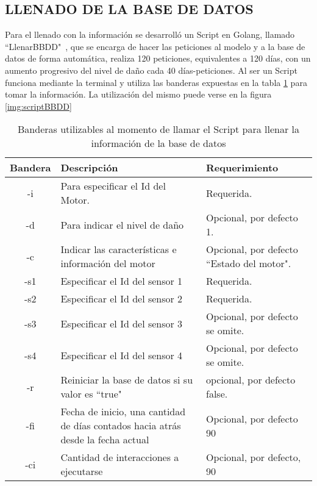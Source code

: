 \subsection{LLENADO DE LA BASE DE DATOS}
    Para el llenado con la información se desarrolló un Script en Golang,
    llamado ``LlenarBBDD"\ , que
    se encarga de hacer las peticiones al modelo y a la base de datos de forma
    automática, realiza 120 peticiones, equivalentes a 120 días, con un aumento
    progresivo del nivel de daño cada 40 días-peticiones. Al ser un Script funciona
    mediante la terminal y utiliza las banderas expuestas en la tabla
    \ref{tab:BanderasLLenadoBBDD} para tomar la información. La utilización del
    mismo puede verse en la figura \ref{img:scriptBBDD}

\begin{table}[ht]
        \begin{center}
        \caption[Banderas Script para el llenado de la BBDD]{
        Banderas utilizables al momento de llamar el Script para llenar la información
        de la base de datos}
        \label{tab:BanderasLLenadoBBDD}

            \vspace{0.3cm}
            \begin{tabular}{|c|p{7cm}|p{5cm}|}
                \hline
                Bandera & Descripción & Requerimiento \\\hline
                \hline
                -i & Para especificar el Id del Motor. & Requerida.\\\hline
                -d & Para indicar el nivel de daño  & Opcional, por defecto 1.\\\hline
                -c & Indicar las características e información del motor & Opcional, por defecto ``Estado del motor".\\\hline
                -s1& Especificar el Id del sensor 1 &Requerida.\\\hline
                -s2& Especificar el Id del sensor 2 &Requerida.\\\hline
                -s3& Especificar el Id del sensor 3 & Opcional, por defecto se omite.\\\hline
                -s4& Especificar el Id del sensor 4  &Opcional, por defecto se omite.\\\hline
                -r & Reiniciar la base de datos si su valor es ``true"& opcional, por defecto false.\\\hline
                -fi& Fecha de inicio, una cantidad de días contados hacia atrás desde la fecha actual& Opcional, por defecto 90\\\hline
                -ci& Cantidad de interacciones a ejecutarse&Opcional, por defecto, 90
                \\\hline
            \end{tabular}
        \end{center}
    \end{table}

